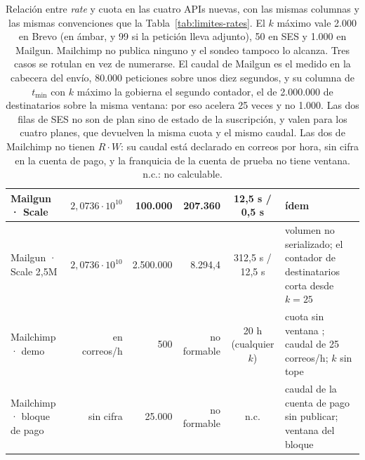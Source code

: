 \begin{table}[H]
\begin{tabular}{|l|r|r|r|c|p{2.7cm}|}
\hline
Mailgun · Scale & $2{,}0736 \cdot 10^{10}$ & 100.000 & 207.360 & 12,5 s / 0,5 s & ídem \\
\hline
Mailgun · Scale 2,5M & $2{,}0736 \cdot 10^{10}$ & 2.500.000 & 8.294,4 & 312,5 s / 12,5 s & volumen no serializado; el contador de destinatarios corta desde $k = 25$ \\
\hline
Mailchimp · demo & en correos/h & 500 & no formable & 20 h (cualquier $k$) & cuota sin ventana \semrojo{}; caudal de 25 correos/h; $k$ sin tope \semrojo{} \\
\hline
Mailchimp · bloque de pago & sin cifra & 25.000 & no formable & n.c. & caudal de la cuenta de pago sin publicar; ventana del bloque \semambar{} \\
\hline
\end{tabular}
\caption{Relación entre \textit{rate} y cuota en las cuatro APIs nuevas, con las mismas columnas y las mismas convenciones que la Tabla~\ref{tab:limites-rates}. El $k$ máximo vale 2.000 en Brevo (en ámbar, y 99 si la petición lleva adjunto), 50 en SES y 1.000 en Mailgun. Mailchimp no publica ninguno y el sondeo tampoco lo alcanza. Tres casos se rotulan en vez de numerarse. El caudal de Mailgun es el medido en la cabecera del envío, 80.000 peticiones sobre unos diez segundos, y su columna de $t_{\min}$ con $k$ máximo la gobierna el segundo contador, el de 2.000.000 de destinatarios sobre la misma ventana: por eso acelera 25 veces y no 1.000. Las dos filas de SES no son de plan sino de estado de la suscripción, y valen para los cuatro planes, que devuelven la misma cuota y el mismo caudal. Las dos de Mailchimp no tienen $R \cdot W$: su caudal está declarado en correos por hora, sin cifra en la cuenta de pago, y la franquicia de la cuenta de prueba no tiene ventana. n.c.: no calculable.}
\label{tab:limites-rates-b}
\end{table}

